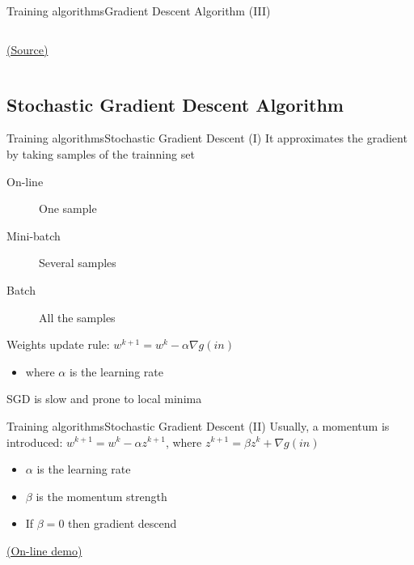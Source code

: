 \documentclass[10pt,compress]{beamer} %
\begin{document}
\begin{frame}{Training algorithms}{Gradient Descent Algorithm (III)}
\begin{columns}
\begin{center}
	\scriptsize \href{http://www.turingfinance.com/misconceptions-about-neural-networks/}{(Source)}
	\end{center}
	\end{columns}
\end{frame}

\subsection{Stochastic Gradient Descent Algorithm}
\begin{frame}{Training algorithms}{Stochastic Gradient Descent (I)}
	It approximates the gradient by taking samples of the trainning set
		\begin{description}
			\item[On-line] One sample
			\item[Mini-batch] Several samples
			\item[Batch] All the samples
		\end{description}
	Weights update rule: $w^{k+1} = w^k - \alpha \nabla g(in)$
		\begin{itemize}
			\item where $\alpha$ is the learning rate
		\end{itemize}
    SGD is slow and prone to local minima
\end{frame}

\begin{frame}{Training algorithms}{Stochastic Gradient Descent (II)}
	Usually, a momentum is introduced: $w^{k+1} = w^k - \alpha z^{k+1}$, where $z^{k+1} = \beta z^k + \nabla g(in)$
		\begin{itemize}
			\item $\alpha$ is the learning rate
			\item $\beta$ is the momentum strength
            \item If $\beta = 0$ then gradient descend
		\end{itemize}
    \href{http://distill.pub/2017/momentum/}{(On-line demo)}
\end{frame}
\end{document}
